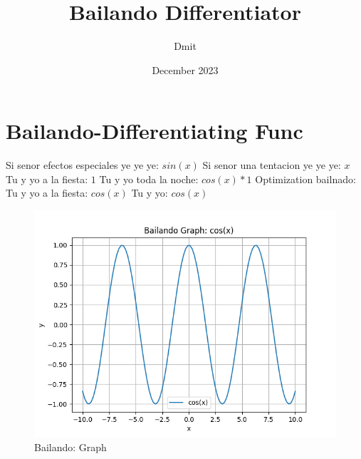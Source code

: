 \documentclass{article}
\title{Bailando Differentiator}
\author{Dmit}
\date{December 2023}
\begin{document}
 
\maketitle 
\section{Bailando-Differentiating Func} 
Si senor efectos especiales ye ye ye: $sin(x)$  \newline Si senor una tentacion ye ye ye: $x$ Tu y yo a la fiesta: $1$  \newline Tu y yo toda la noche: $cos(x)*1$  \newline \newline Optimization bailnado: \newline Tu y yo a la fiesta: $cos(x)$  \newline Tu y yo: $cos(x)$  \newline \begin{figure}
\centering
\includegraphics[width=0.8\linewidth]{Bailando Graph.png}
\caption{Bailando: Graph}
\label{fig:my_image}
\end{figure}
\end{document}
